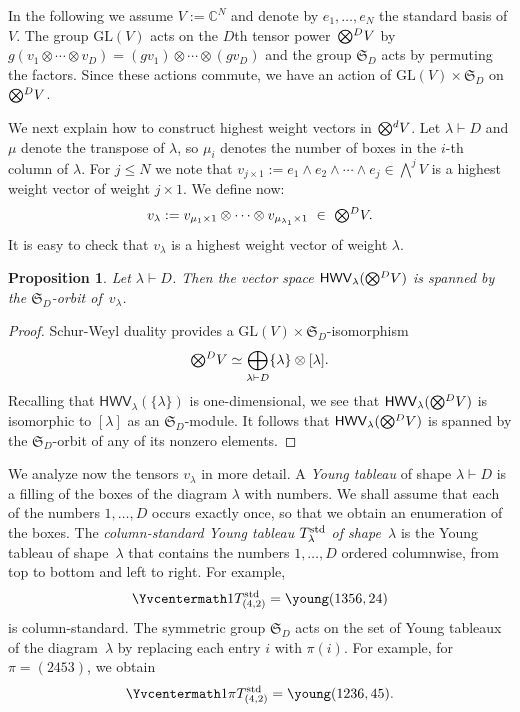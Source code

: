 \documentclass[11pt]{amsart}
\def\GL{\mathrm{GL}}
\def\la{\lambda}
\def\ot{\otimes}
\newcommand{\IC}{\ensuremath{\mathbb{C}}}
\newcommand{\aS}{\ensuremath{\mathfrak{S}}}
\newcommand{\tensor}{\smash{\textstyle\bigotimes}}
\newcommand{\HWV}{\mathsf{HWV}}
\numberwithin{equation}{section}
\newtheorem{proposition}[theorem]{Proposition}
\begin{document}
In the following we assume $V:=\IC^N$ and denote by $e_1,\ldots,e_N$ the standard basis of $V$. 
The group $\GL(V)$ acts on the $D$th tensor power~$\tensor^D V$  
by $g (v_1\ot\cdots\ot v_D) = (gv_1)\ot\cdots\ot (gv_D)$ and the group $\aS_D$ 
acts by permuting the factors. Since these actions commute, we have an action of 
$\GL(V) \times \aS_D$ on $\tensor^D V$.  

We next explain how to construct highest weight vectors in $\tensor^d V$.
Let $\la\vdash D$ and $\mu$ denote the transpose of $\la$, 
so $\mu_i$ denotes the number of boxes in the $i$-th column of $\la$.
For $j \le N$ we note that 
$v_{j\times 1} := e_1 \wedge e_2 \wedge \cdots \wedge e_j \in \bigwedge^j V$ 
is a highest weight vector of weight $j \times 1$. 
We define now: 
\begin{equation}\label{eq:vla}
v_\la := v_{\mu_1 \times 1} \ot\cdots\ot v_{\mu_{\lambda_1} \times 1} \ \in\ \tensor^D V.
\end{equation}
It is easy to check that $v_\la$ is a highest weight vector of weight $\la$. 

\begin{proposition}\label{pro:orbit-HWV} 
Let $\la\vdash D$. Then the vector space $\HWV_\la(\tensor^D V)$ is spanned by 
the $\aS_D$-orbit of~$v_\la$. 
\end{proposition}

\begin{proof}
Schur-Weyl duality provides a $\GL(V) \times \aS_D$-isomorphism 
\[
\tensor^D V \simeq \bigoplus_{\la \vdash D} \{\la\} \otimes [\la] .
\]
Recalling that $\HWV_\la(\{\la\})$ is one-dimensional, we see that 
$\HWV_\la(\tensor^D V)$ is isomorphic to $[\la]$ as an $\aS_D$-module. 
It follows that $\HWV_\la(\tensor^D V)$ is spanned by the $\aS_D$-orbit of any of its nonzero elements. 
\end{proof}

We analyze now the tensors $v_\la$ in more detail. 
A {\em Young tableau} of shape $\la\vdash D$ 
is a filling of the boxes of the diagram $\la$ with numbers. 
We shall assume that each of the numbers $1,\ldots,D$ occurs exactly once, 
so that we obtain an enumeration of the boxes. 
The \emph{column-standard Young tableau $T^\textup{std}_\la$ of shape~$\la$} is the Young tableau 
of shape~$\la$ that contains the numbers $1,\ldots,D$ ordered columnwise, 
from top to bottom and left to right. For example,
\[
\Yvcentermath1 T^\textup{std}_{(4,2)} = \young(1356,24)
\]
is column-standard.
The symmetric group $\aS_{D}$ acts on the set of Young tableaux %
of the diagram~$\la$ by replacing each entry $i$ with $\pi(i)$.
For example, for $\pi= (2453)$, we obtain
\begin{equation}\label{eq:exatableau}
\Yvcentermath1 \pi T^\textup{std}_{(4,2)} = \young(1236,45).
\end{equation}
\end{document}
